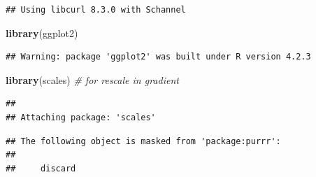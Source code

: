 \documentclass[
]{article}
\newenvironment{Shaded}{\begin{snugshade}}{\end{snugshade}}
\newcommand{\CommentTok}[1]{\textcolor[rgb]{0.56,0.35,0.01}{\textit{#1}}}
\newcommand{\FunctionTok}[1]{\textcolor[rgb]{0.13,0.29,0.53}{\textbf{#1}}}
\newcommand{\NormalTok}[1]{#1}
\begin{document}
\begin{verbatim}
## Using libcurl 8.3.0 with Schannel
\end{verbatim}

\begin{Shaded}
\begin{Highlighting}[]
\FunctionTok{library}\NormalTok{(ggplot2)}
\end{Highlighting}
\end{Shaded}

\begin{verbatim}
## Warning: package 'ggplot2' was built under R version 4.2.3
\end{verbatim}

\begin{Shaded}
\begin{Highlighting}[]
\FunctionTok{library}\NormalTok{(scales)   }\CommentTok{\# for rescale in gradient}
\end{Highlighting}
\end{Shaded}

\begin{verbatim}
## 
## Attaching package: 'scales'
\end{verbatim}

\begin{verbatim}
## The following object is masked from 'package:purrr':
## 
##     discard
\end{verbatim}
\end{document}
